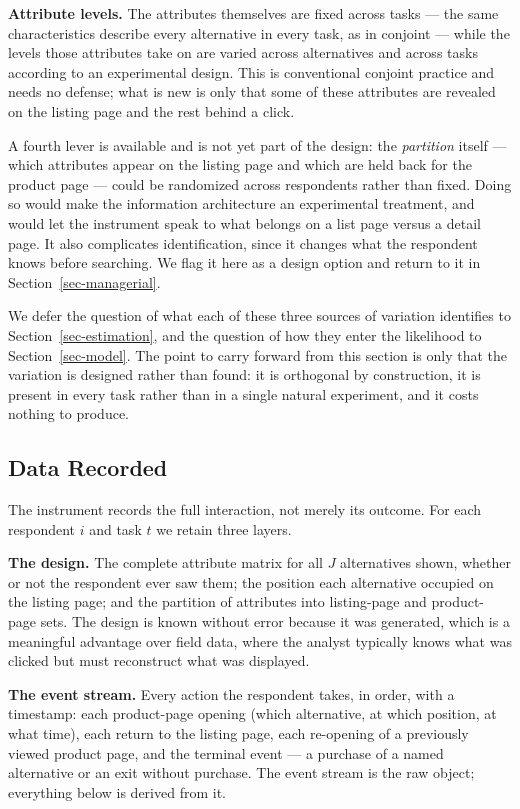\documentclass[
  letterpaper,
  DIV=11,
  numbers=noendperiod]{scrartcl}
\begin{document}
\textbf{Attribute levels.} The attributes themselves are fixed across
tasks --- the same characteristics describe every alternative in every
task, as in conjoint --- while the levels those attributes take on are
varied across alternatives and across tasks according to an experimental
design. This is conventional conjoint practice and needs no defense;
what is new is only that some of these attributes are revealed on the
listing page and the rest behind a click.

A fourth lever is available and is not yet part of the design: the
\emph{partition} itself --- which attributes appear on the listing page
and which are held back for the product page --- could be randomized
across respondents rather than fixed. Doing so would make the
information architecture an experimental treatment, and would let the
instrument speak to what belongs on a list page versus a detail page. It
also complicates identification, since it changes what the respondent
knows before searching. We flag it here as a design option and return to
it in Section~\ref{sec-managerial}.

We defer the question of what each of these three sources of variation
identifies to Section~\ref{sec-estimation}, and the question of how they
enter the likelihood to Section~\ref{sec-model}. The point to carry
forward from this section is only that the variation is designed rather
than found: it is orthogonal by construction, it is present in every
task rather than in a single natural experiment, and it costs nothing to
produce.

\subsection{Data Recorded}\label{sec-instrument-data}

The instrument records the full interaction, not merely its outcome. For
each respondent \(i\) and task \(t\) we retain three layers.

\textbf{The design.} The complete attribute matrix for all \(J\)
alternatives shown, whether or not the respondent ever saw them; the
position each alternative occupied on the listing page; and the
partition of attributes into listing-page and product-page sets. The
design is known without error because it was generated, which is a
meaningful advantage over field data, where the analyst typically knows
what was clicked but must reconstruct what was displayed.

\textbf{The event stream.} Every action the respondent takes, in order,
with a timestamp: each product-page opening (which alternative, at which
position, at what time), each return to the listing page, each
re-opening of a previously viewed product page, and the terminal event
--- a purchase of a named alternative or an exit without purchase. The
event stream is the raw object; everything below is derived from it.
\end{document}
